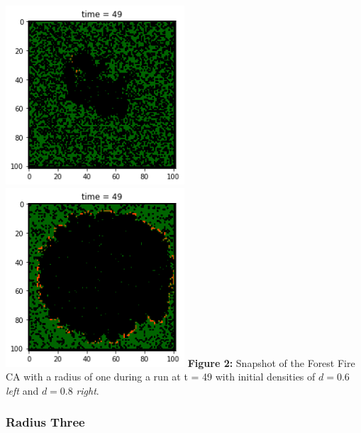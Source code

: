\documentclass[]{article}
\begin{document}
\includegraphics[width=0.5\textwidth,height=\textheight]{../plots/ForestPlot_d6r1.png}
\includegraphics[width=0.5\textwidth,height=\textheight]{../plots/ForestPlot_d8r1.png}
\textbf{Figure 2:} Snapshot of the Forest Fire CA with a radius of one
during a run at t = 49 with initial densities of \(d = 0.6\) \emph{left}
and \(d = 0.8\) \emph{right}.

\hypertarget{radius-three}{%
\subsubsection{Radius Three}\label{radius-three}}
\end{document}
